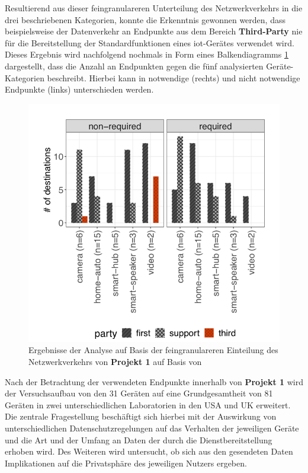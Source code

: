 \noindent Resultierend aus dieser feingranulareren Unterteilung des Netzwerkverkehrs in die drei beschriebenen Kategorien, konnte die Erkenntnis gewonnen werden, dass beispielsweise der Datenverkehr an Endpunkte aus dem Bereich \textbf{Third-Party} nie für die Bereitstellung der Standardfunktionen eines \ac{iot}-Gerätes verwendet wird. Dieses Ergebnis wird nachfolgend nochmals in Form eines Balkendiagramms \ref{fig:result-non-req-dest-per-party} dargestellt, dass die Anzahl an Endpunkten gegen die fünf analysierten Geräte-Kategorien beschreibt. Hierbei kann in notwendige (rechts) und nicht notwendige Endpunkte (links) unterschieden werden. 
\begin{figure}
    \centering
    \includegraphics[scale=0.3]{main/pictures/projekt_one/Non_Required_Destination_Per_Party}
    \caption{Ergebnisse der Analyse auf Basis der feingranulareren Einteilung des Netzwerkverkehrs von \textbf{Projekt 1} auf Basis von \cite{Mandalari2021}}
    \label{fig:result-non-req-dest-per-party}
\end{figure}

\noindent Nach der Betrachtung der verwendeten Endpunkte innerhalb von \textbf{Projekt 1} wird der Versuchsaufbau von den 31 Geräten auf eine Grundgesamtheit von 81 Geräten in zwei unterschiedlichen Laboratorien in den USA und UK erweitert. Die zentrale Fragestellung beschäftigt sich hierbei mit der Auswirkung von unterschiedlichen Datenschutzregelungen auf das Verhalten der jeweiligen Geräte und die Art und der Umfang an Daten der durch die Dienstbereitstellung erhoben wird. Des Weiteren wird untersucht, ob sich aus den gesendeten Daten Implikationen auf die Privatsphäre des jeweiligen Nutzers ergeben.

